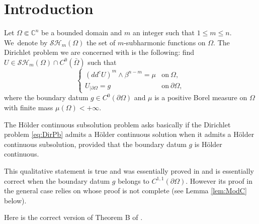 \documentclass[11pt]{article}
\providecommand{\C}{}
\numberwithin{equation}{section}
\theoremstyle{definition}
\renewcommand{\C}{\mathbb{C}}
\theoremstyle{plain}
\theoremstyle{definition}
\begin{document}
\section{Introduction}
Let $\Omega \Subset \C^n$ be a bounded domain and $m$ an integer such that $1 \leq m \leq n$. We~deno\-te by $\mathcal{SH}_m (\Omega)$ the set of $m$-subharmonic functions on $\Omega$. The Dirichlet problem we are concerned with is the following: find $U \in \mathcal{SH}_m (\Omega) \cap C^0 (\bar{\Omega})$ such that
\begin{equation}\label{eq:DirPb}
\begin{cases}
(dd^c U)^m \wedge \beta^{n - m} = \mu &\text{on}\ \Omega, \\
U_{\mid \partial \Omega} = g & \text{on}\ \partial \Omega,
\end{cases}
\end{equation}
where the boundary datum $g \in C^0 (\partial \Omega)$ and $\mu$ is a positive Borel measure on $\Omega$ with finite mass $\mu (\Omega) < + \infty$.

The Hölder continuous subsolution problem asks basically if the Dirichlet problem \eqref{eq:DirPb} admits a Hölder continuous solution when it admits a Hölder continuous subsolution, provided that the boundary datum $g$ is Hölder continuous.

This qualitative statement is true and was essentially proved in \cite[Th.\,B]{BZ20} and is essentially correct when the boundary datum $g$ belongs to $C^{1,1} (\partial \Omega)$. However its proof in the general case relies on \cite[Lem.\,4.2]{BZ20} whose proof is not complete (see Lemma \ref{lem:ModC} below).

Here is the correct version of Theorem B of \cite{BZ20}.
\end{document}
